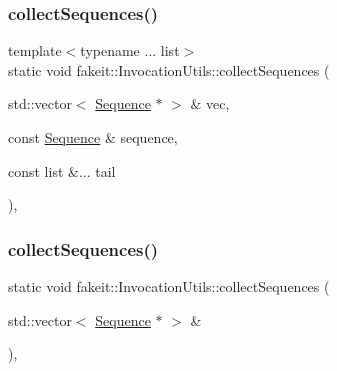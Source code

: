 \subsubsection{\texorpdfstring{collectSequences()}{collectSequences()}\hspace{0.1cm}{\footnotesize\ttfamily [2/18]}}
{\footnotesize\ttfamily template$<$typename ... list$>$ \\
static void fakeit\+::\+Invocation\+Utils\+::collect\+Sequences (\begin{DoxyParamCaption}\item[{std\+::vector$<$ \mbox{\hyperlink{classfakeit_1_1Sequence}{Sequence}} $\ast$ $>$ \&}]{vec,  }\item[{const \mbox{\hyperlink{classfakeit_1_1Sequence}{Sequence}} \&}]{sequence,  }\item[{const list \&...}]{tail }\end{DoxyParamCaption})\hspace{0.3cm}{\ttfamily [inline]}, {\ttfamily [static]}}

\mbox{\label{structfakeit_1_1InvocationUtils_ac2d11afbe797cdd0978cf42a25c4c1a6}} 
\subsubsection{\texorpdfstring{collectSequences()}{collectSequences()}\hspace{0.1cm}{\footnotesize\ttfamily [3/18]}}
{\footnotesize\ttfamily static void fakeit\+::\+Invocation\+Utils\+::collect\+Sequences (\begin{DoxyParamCaption}\item[{std\+::vector$<$ \mbox{\hyperlink{classfakeit_1_1Sequence}{Sequence}} $\ast$ $>$ \&}]{ }\end{DoxyParamCaption})\hspace{0.3cm}{\ttfamily [inline]}, {\ttfamily [static]}}

\mbox{\label{structfakeit_1_1InvocationUtils_a43b674a2f1109acf4c870e8fb9c2571d}} 
